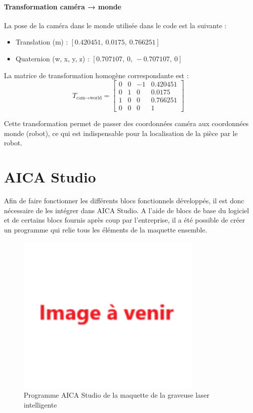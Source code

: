\paragraph{Transformation caméra → monde}
La pose de la caméra dans le monde utilisée dans le code est la suivante :
\begin{itemize}
    \item Translation (m) : $[0.420451,\ 0.0175,\ 0.766251]$
    \item Quaternion (w, x, y, z) : $[0.707107,\ 0,\ -0.707107,\ 0]$
\end{itemize}

La matrice de transformation homogène correspondante est :
\begin{equation*}
    T_{\text{cam} \to \text{world}} =
    \begin{bmatrix}
        0 & 0 & -1 & 0.420451 \\
        0 & 1 & 0  & 0.0175   \\
        1 & 0 & 0  & 0.766251 \\
        0 & 0 & 0  & 1
    \end{bmatrix}
\end{equation*}

Cette transformation permet de passer des coordonnées caméra aux coordonnées monde (robot), ce qui est indispensable pour la localisation de la pièce par le robot.

\section{AICA Studio}
Afin de faire fonctionner les différents blocs fonctionnels développés, il est donc nécessaire de les intégrer dans AICA Studio. A l'aide de blocs de base du logiciel et de certains blocs fournis après coup par l'entreprise, il a été possible de créer un programme qui relie tous les éléments de la maquette ensemble.
\begin{figure}[H]
    \centering
    \includegraphics[width=0.8\textwidth]{assets/figures/img_a_venir.png}
    \caption{Programme AICA Studio de la maquette de la graveuse laser intelligente}
    \label{fig:aica_programme}
\end{figure}


